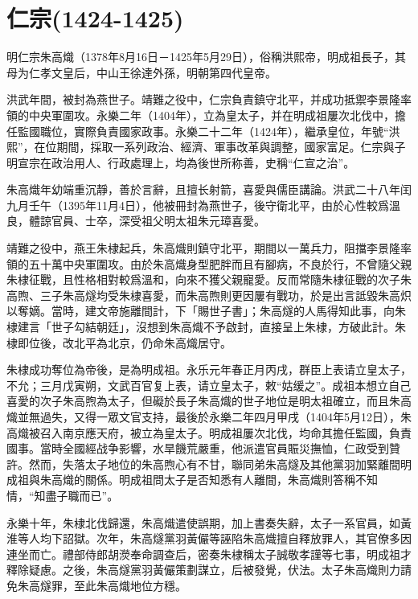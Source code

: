 
\section{仁宗\tiny(1424-1425)}

明仁宗朱高熾（1378年8月16日－1425年5月29日），俗稱洪熙帝，明成祖長子，其母为仁孝文皇后，中山王徐達外孫，明朝第四代皇帝。

洪武年間，被封為燕世子。靖難之役中，仁宗負責鎮守北平，并成功抵禦李景隆率領的中央軍圍攻。永樂二年（1404年），立為皇太子，并在明成祖屢次北伐中，擔任監國職位，實際負責國家政事。永樂二十二年（1424年），繼承皇位，年號“洪熙”，在位期間，採取一系列政治、經濟、軍事改革與調整，國家富足。仁宗與子明宣宗在政治用人、行政處理上，均為後世所称善，史稱“仁宣之治”。

朱高熾年幼端重沉靜，善於言辭，且擅长射箭，喜愛與儒臣講論。洪武二十八年闰九月壬午（1395年11月4日），他被冊封為燕世子，後守衛北平，由於心性較爲溫良，體諒官員、士卒，深受祖父明太祖朱元璋喜愛。

靖難之役中，燕王朱棣起兵，朱高熾則鎮守北平，期間以一萬兵力，阻擋李景隆率領的五十萬中央軍圍攻。由於朱高熾身型肥胖而且有腳病，不良於行，不曾隨父親朱棣征戰，且性格相對較爲溫和，向來不獲父親寵愛。反而常隨朱棣征戰的次子朱高煦、三子朱高燧均受朱棣喜愛，而朱高煦則更因屢有戰功，於是出言詆毀朱高炽以奪嫡。當時，建文帝施離間計，下「賜世子書」；朱高燧的人馬得知此事，向朱棣建言「世子勾結朝廷」，沒想到朱高熾不予啟封，直接呈上朱棣，方破此計。朱棣即位後，改北平為北京，仍命朱高熾居守。

朱棣成功奪位為帝後，是為明成祖。永乐元年春正月丙戌，群臣上表请立皇太子，不允；三月戊寅朔，文武百官复上表，请立皇太子，敕“姑缓之”。成祖本想立自己喜愛的次子朱高煦為太子，但礙於長子朱高熾的世子地位是明太祖確立，而且朱高熾並無過失，又得一眾文官支持，最後於永樂二年四月甲戌（1404年5月12日），朱高熾被召入南京應天府，被立為皇太子。明成祖屢次北伐，均命其擔任監國，負責國事。當時全國經战争影響，水旱饑荒嚴重，他派遣官員賑災撫恤，仁政受到贊許。然而，失落太子地位的朱高煦心有不甘，聯同弟朱高燧及其他黨羽加緊離間明成祖與朱高熾的關係。明成祖問太子是否知悉有人離間，朱高熾則答稱不知情，“知盡子職而已”。

永樂十年，朱棣北伐歸還，朱高熾遣使誤期，加上書奏失辭，太子一系官員，如黃淮等人均下詔獄。次年，朱高燧黨羽黃儼等誣陷朱高熾擅自釋放罪人，其官僚多因連坐而亡。禮部侍郎胡濙奉命調查后，密奏朱棣稱太子誠敬孝謹等七事，明成祖才釋除疑慮。之後，朱高燧黨羽黃儼策劃謀立，后被發覺，伏法。太子朱高熾則力請免朱高燧罪，至此朱高熾地位方穩。

